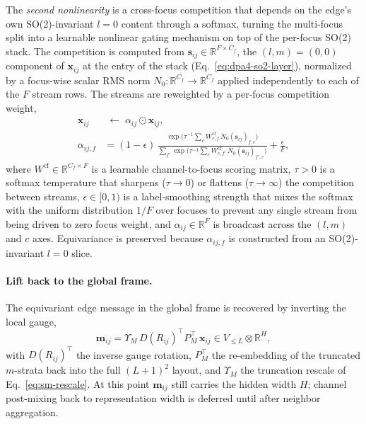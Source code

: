 The \emph{second nonlinearity} is a cross-focus competition that depends on the edge's own SO(2)-invariant $l=0$ content through a softmax, turning the multi-focus split into a learnable nonlinear gating mechanism on top of the per-focus SO(2) stack.
The competition is computed from $\mathbf{s}_{ij}\in\mathbb{R}^{F\times C_f}$, the $(l,m)=(0,0)$ component of $\mathbf{x}_{ij}$ at the entry of the stack (Eq.~\eqref{eq:dpa4-so2-layer}), normalized by a focus-wise scalar RMS norm $N_0:\mathbb{R}^{C_f}\to\mathbb{R}^{C_f}$ applied independently to each of the $F$ stream rows.
The streams are reweighted by a per-focus competition weight,
\begin{equation}
    \begin{aligned}
        \mathbf{x}_{ij} & \;\leftarrow\; \alpha_{ij}\odot\mathbf{x}_{ij},                                     \\[2pt]
        \alpha_{ij,f}   & = (1-\epsilon)\,\frac{\exp\!\bigl(\tau^{-1}\sum_{c}
        W^{\mathrm{cf}}_{c,f}\, N_0(\mathbf{s}_{ij})_{f,c}\bigr)} {\sum_{f'}\exp\!
            \bigl(\tau^{-1}\sum_{c}
        W^{\mathrm{cf}}_{c,f'}\, N_0(\mathbf{s}_{ij})_{f',c}\bigr)} +\frac{\epsilon}{F},
    \end{aligned}
    \label{eq:dpa4-focus-compete}
\end{equation}
where $W^{\mathrm{cf}}\in\mathbb{R}^{C_f\times F}$ is a learnable channel-to-focus scoring matrix, $\tau>0$ is a softmax temperature that sharpens ($\tau\to 0$) or flattens ($\tau\to\infty$) the competition between streams, $\epsilon\in[0,1)$ is a label-smoothing strength that mixes the softmax with the uniform distribution $1/F$ over focuses to prevent any single stream from being driven to zero focus weight, and $\alpha_{ij}\in\mathbb{R}^{F}$ is broadcast across the $(l,m)$ and $c$ axes.
Equivariance is preserved because $\alpha_{ij,f}$ is constructed from an SO(2)-invariant $l=0$ slice.

\paragraph{Lift back to the global frame.}
The equivariant edge message in the global frame is recovered by inverting the
local gauge,
\begin{equation}
    \mathbf{m}_{ij}
    =
    \Upsilon_M\,D(R_{ij})^{\top}
    P_M^{\top}\,\mathbf{x}_{ij} \in V_{\le L}\otimes\mathbb{R}^{H}, \label{eq:dpa4-edge-message} \end{equation} with $D(R_{ij})^{\top}$ the inverse gauge rotation, $P_M^{\top}$ the re-embedding of the truncated $m$-strata back into the full $(L+1)^2$ layout, and $\Upsilon_M$ the truncation rescale of Eq.~\eqref{eq:sm-rescale}.
At this point $\mathbf{m}_{ij}$ still carries the hidden width $H$; channel post-mixing back to representation width is deferred until after neighbor aggregation.

